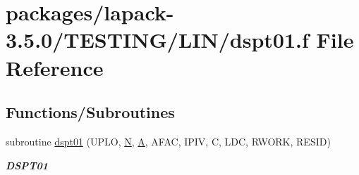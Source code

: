 \hypertarget{dspt01_8f}{}\section{packages/lapack-\/3.5.0/\+T\+E\+S\+T\+I\+N\+G/\+L\+I\+N/dspt01.f File Reference}
\label{dspt01_8f}
\subsection*{Functions/\+Subroutines}
\begin{DoxyCompactItemize}
\item 
subroutine \hyperlink{group__double__lin_ga508e28449eb6256ecfecab15751e327a}{dspt01} (U\+P\+L\+O, \hyperlink{polmisc_8c_a0240ac851181b84ac374872dc5434ee4}{N}, \hyperlink{classA}{A}, A\+F\+A\+C, I\+P\+I\+V, C, L\+D\+C, R\+W\+O\+R\+K, R\+E\+S\+I\+D)
\begin{DoxyCompactList}\small\item\em {\bfseries D\+S\+P\+T01} \end{DoxyCompactList}\end{DoxyCompactItemize}
